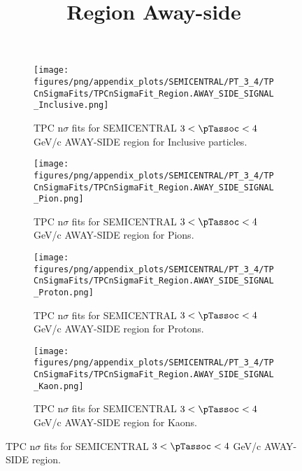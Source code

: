             \begin{figure}[H]
                \title{Region Away-side}
                \begin{subfigure}[b]{0.5\textwidth}
                    \centering
                    \texttt{[image: figures/png/appendix\_plots/SEMICENTRAL/PT\_3\_4/TPCnSigmaFits/TPCnSigmaFit\_Region.AWAY\_SIDE\_SIGNAL\_Inclusive.png]}
                    \caption{TPC n$\sigma$ fits for SEMICENTRAL $3 < \pTassoc < 4$ GeV/c AWAY-SIDE region for Inclusive particles.}
                    \label{fig:appendix_SEMICENTRAL_$3 < \pTassoc < 4$ GeV/c_AWAY_SIDE_SIGNAL_Inclusive}
                \end{subfigure}
                \begin{subfigure}[b]{0.5\textwidth}
                    \centering
                    \texttt{[image: figures/png/appendix\_plots/SEMICENTRAL/PT\_3\_4/TPCnSigmaFits/TPCnSigmaFit\_Region.AWAY\_SIDE\_SIGNAL\_Pion.png]}
                    \caption{TPC n$\sigma$ fits for SEMICENTRAL $3 < \pTassoc < 4$ GeV/c AWAY-SIDE region for Pions.}
                    \label{fig:appendix_SEMICENTRAL_$3 < \pTassoc < 4$ GeV/c_AWAY_SIDE_SIGNAL_Pion}
                \end{subfigure}
                \begin{subfigure}[b]{0.5\textwidth}
                    \centering
                    \texttt{[image: figures/png/appendix\_plots/SEMICENTRAL/PT\_3\_4/TPCnSigmaFits/TPCnSigmaFit\_Region.AWAY\_SIDE\_SIGNAL\_Proton.png]}
                    \caption{TPC n$\sigma$ fits for SEMICENTRAL $3 < \pTassoc < 4$ GeV/c AWAY-SIDE region for Protons.}
                    \label{fig:appendix_SEMICENTRAL_$3 < \pTassoc < 4$ GeV/c_AWAY_SIDE_SIGNAL_Proton}
                \end{subfigure}
                \begin{subfigure}[b]{0.5\textwidth}
                    \centering
                    \texttt{[image: figures/png/appendix\_plots/SEMICENTRAL/PT\_3\_4/TPCnSigmaFits/TPCnSigmaFit\_Region.AWAY\_SIDE\_SIGNAL\_Kaon.png]}
                    \caption{TPC n$\sigma$ fits for SEMICENTRAL $3 < \pTassoc < 4$ GeV/c AWAY-SIDE region for Kaons.}
                    \label{fig:appendix_SEMICENTRAL_$3 < \pTassoc < 4$ GeV/c_AWAY_SIDE_SIGNAL_Kaon}
                \end{subfigure}
                \caption{TPC n$\sigma$ fits for SEMICENTRAL $3 < \pTassoc < 4$ GeV/c AWAY-SIDE region.}
                \label{fig:appendix_SEMICENTRAL_$3 < \pTassoc < 4$ GeV/c_AWAY_SIDE_SIGNAL}
            \end{figure}
